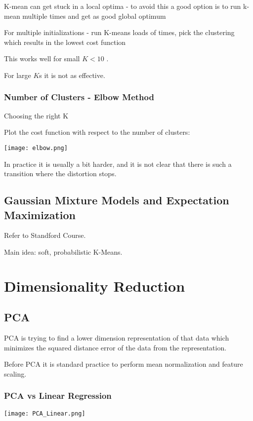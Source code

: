 K-mean can get stuck in a local optima - to avoid this a good option is to run k-mean multiple times and get as good global optimum

For multiple initializations - run K-means loads of times, pick the clustering which results in the lowest cost function

This works well for small $K < 10$ .

For large $K$s it is not as effective.

\subsubsection{Number of Clusters - Elbow Method}

Choosing the right K 

Plot the cost function with respect to the number of clusters:

\texttt{[image: elbow.png]}

In practice it is usually a bit harder, and it is not clear that there is such a transition where the distortion stops.

\subsection{Gaussian Mixture Models and Expectation Maximization}

Refer to Standford Course. 

Main idea: soft, probabilistic K-Means.

\section{Dimensionality Reduction}

\subsection{PCA}

PCA is trying to find a lower dimension representation of that data which minimizes the squared distance error of the data from the representation.

Before PCA it is standard practice to perform mean normalization and feature scaling. 

\subsubsection{PCA vs Linear Regression}

\texttt{[image: PCA\_Linear.png]}

